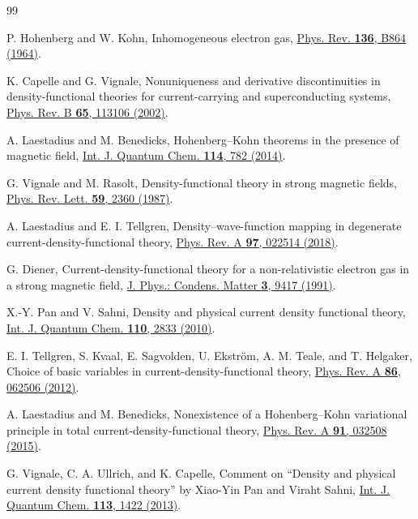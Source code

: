 \documentclass[11pt,a4paper]{article}
\theoremstyle{remark}
\theoremstyle{plain}
\begin{document}
\begin{thebibliography}{99}

P. Hohenberg and W. Kohn,
Inhomogeneous electron gas,
\href{https://doi.org/10.1103/PhysRev.136.B864}
{Phys. Rev. \textbf{136}, B864 (1964)}.

K. Capelle and G. Vignale,
Nonuniqueness and derivative discontinuities in density-functional
theories for current-carrying and superconducting systems,
\href{https://doi.org/10.1103/PhysRevB.65.113106}
{Phys. Rev. B \textbf{65}, 113106 (2002)}.

A. Laestadius and M. Benedicks,
Hohenberg--Kohn theorems in the presence of magnetic field,
\href{https://doi.org/10.1002/qua.24668}
{Int. J. Quantum Chem. \textbf{114}, 782 (2014)}.

G. Vignale and M. Rasolt,
Density-functional theory in strong magnetic fields,
\href{https://doi.org/10.1103/PhysRevLett.59.2360}
{Phys. Rev. Lett. \textbf{59}, 2360 (1987)}.

A. Laestadius and E. I. Tellgren,
Density--wave-function mapping in degenerate current-density-functional
theory,
\href{https://doi.org/10.1103/PhysRevA.97.022514}
{Phys. Rev. A \textbf{97}, 022514 (2018)}.

G. Diener,
Current-density-functional theory for a non-relativistic electron gas
in a strong magnetic field,
\href{https://doi.org/10.1088/0953-8984/3/47/014}
{J. Phys.: Condens. Matter \textbf{3}, 9417 (1991)}.

X.-Y. Pan and V. Sahni,
Density and physical current density functional theory,
\href{https://doi.org/10.1002/qua.22862}
{Int. J. Quantum Chem. \textbf{110}, 2833 (2010)}.

E. I. Tellgren, S. Kvaal, E. Sagvolden, U. Ekstr\"om,
A. M. Teale, and T. Helgaker,
Choice of basic variables in current-density-functional theory,
\href{https://doi.org/10.1103/PhysRevA.86.062506}
{Phys. Rev. A \textbf{86}, 062506 (2012)}.

A. Laestadius and M. Benedicks,
Nonexistence of a Hohenberg--Kohn variational principle in total
current-density-functional theory,
\href{https://doi.org/10.1103/PhysRevA.91.032508}
{Phys. Rev. A \textbf{91}, 032508 (2015)}.

G. Vignale, C. A. Ullrich, and K. Capelle,
Comment on ``Density and physical current density functional theory''
by Xiao-Yin Pan and Viraht Sahni,
\href{https://doi.org/10.1002/qua.24327}
{Int. J. Quantum Chem. \textbf{113}, 1422 (2013)}.


\end{thebibliography}
\end{document}
